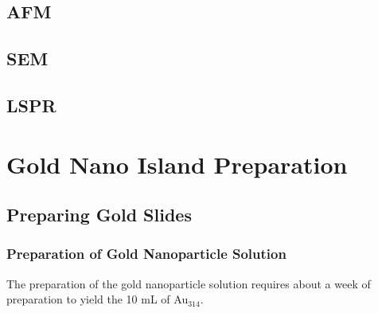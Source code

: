 \documentclass[12pt,oneside,english]{article}
\begin{document}
	\subsection{AFM}
	\subsection{SEM}
	\subsection{LSPR}



	\section{Gold Nano Island Preparation}	

	\subsection{Preparing Gold Slides}
	
	\subsubsection{Preparation of Gold Nanoparticle Solution}
	The preparation of the gold nanoparticle solution requires about a week of preparation to yield the 10 mL of Au$_{314}$.
	
\end{document}
